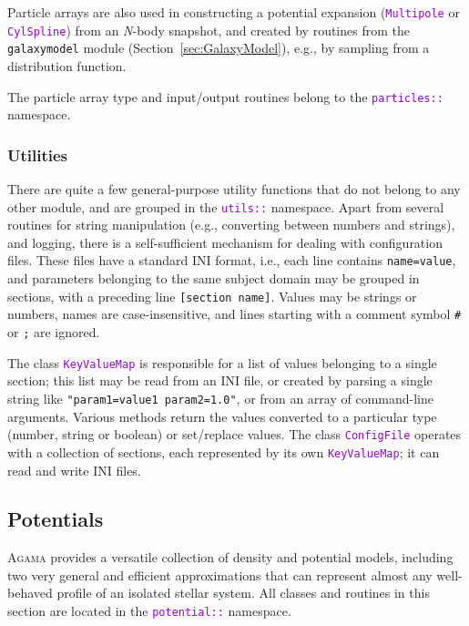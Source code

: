 \documentclass[12pt]{article}
\newcommand{\Agama}{\textsc{Agama}\xspace}
\newcommand{\Nbody}{\textsl{N}-body\xspace}
\newcommand{\ttt}[1]{\textcolor{darkviolet}{\texttt{#1}}}
\newcommand{\ppp}[1]{\textcolor{darkolive} {\texttt{#1}}}
\begin{document}
Particle arrays are also used in constructing a potential expansion (\ttt{Multipole} or \ttt{CylSpline}) from an \Nbody snapshot, and created by routines from the \texttt{galaxymodel} module (Section~\ref{sec:GalaxyModel}), e.g., by sampling from a distribution function.

The particle array type and input/output routines belong to the \ttt{particles::} name\-space.


\subsubsection{Utilities}  \label{sec:Utilities}

There are quite a few general-purpose utility functions that do not belong to any other module, and are grouped in the \ttt{utils::} namespace. 
Apart from several routines for string manipulation (e.g., converting between numbers and strings), and logging, there is a self-sufficient mechanism for dealing with configuration files. These files have a standard INI format, i.e., each line contains \ppp{name=value}, and parameters belonging to the same subject domain may be grouped in sections, with a preceding line \ppp{[section name]}. Values may be strings or numbers, names are case-insensitive, and lines starting with a comment symbol \texttt{\#} or \texttt{;} are ignored.

The class \ttt{KeyValueMap} is responsible for a list of values belonging to a single section; this list may be read from an INI file, or created by parsing a single string like \ppp{"param1=value1 param2=1.0"}, or from an array of command-line arguments. Various methods return the values converted to a particular type (number, string or boolean) or set/replace values.
The class \ttt{ConfigFile} operates with a collection of sections, each represented by its own \ttt{KeyValueMap}; it can read and write INI files.


\subsection{Potentials}  \label{sec:Potential}

\Agama provides a versatile collection of density and potential models, including two very general and efficient approximations that can represent almost any well-behaved profile of an isolated stellar system. All classes and routines in this section are located in the \ttt{potential::} namespace.
\end{document}
